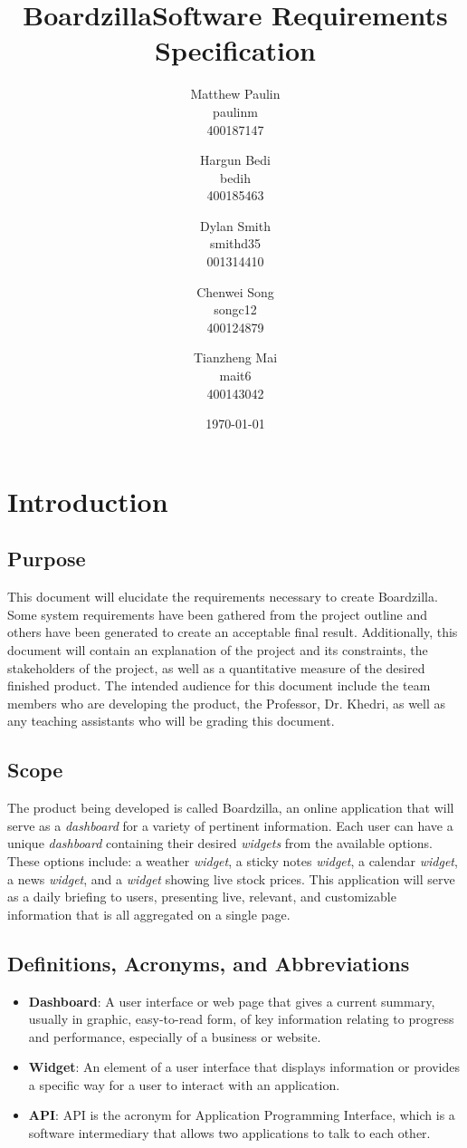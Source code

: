 \documentclass{article}
\title{\textbf{Boardzilla\break Software Requirements Specification}}
\author{Matthew Paulin \\ paulinm \\ 400187147 \and
        Hargun Bedi \\ bedih \\ 400185463 \and
        Dylan Smith \\ smithd35 \\ 001314410 \and
        Chenwei Song \\ songc12 \\ 400124879 \and
        Tianzheng Mai \\ mait6 \\ 400143042
}
\date{\today}
\begin{document}
\maketitle	 
\newpage
\tableofcontents
\newpage
\section{Introduction}
\label{sec:introduction}
\subsection{Purpose}
\label{sub:purpose}
This document will elucidate the requirements necessary to create Boardzilla. Some system requirements have been gathered from the project outline and others have been generated to create an acceptable final result. Additionally, this document will contain an explanation of the project and its constraints, the stakeholders of the project, as well as a quantitative measure of the desired finished product. The intended audience for this document include the team members who are developing the product, the Professor, Dr. Khedri, as well as any teaching assistants who will be grading this document.

\subsection{Scope}
\label{sub:scope}
The product being developed is called Boardzilla, an online application that will serve as a \textit{dashboard} for a variety of pertinent information. Each user can have a unique \textit{dashboard} containing their desired \textit{widgets} from the available options. These options include: a weather \textit{widget}, a sticky notes \textit{widget}, a calendar \textit{widget}, a news \textit{widget}, and a \textit{widget} showing live stock prices. This application will serve as a daily briefing to users, presenting live, relevant, and customizable information that is all aggregated on a single page. 

\subsection{Definitions, Acronyms, and Abbreviations}
\label{sub:definitions_acronyms_and_abbreviations}
\begin{itemize}
	\item \textbf{Dashboard}: A user interface or web page that gives a current summary, usually in graphic, easy-to-read form, of key information relating to progress and performance, especially of a business or website. \cite{dictionary.com}
    \item \textbf{Widget}: An element of a user interface that displays information or provides a specific way for a user to interact with an application. \cite{TechTarget}
    \item \textbf{API}: API is the acronym for Application Programming Interface, which is a software intermediary that allows two applications to talk to each other.
    \cite{Mulesoft}
\end{itemize}
\end{document}
